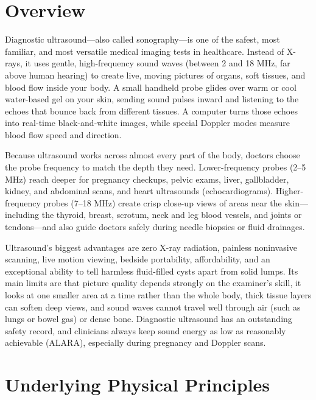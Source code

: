 \label{ch:infographic-ultrasound}

\section{Overview}

Diagnostic ultrasound---also called sonography---is one of the safest, most familiar, and most versatile medical imaging tests in healthcare. Instead of X-rays, it uses gentle, high-frequency sound waves (between 2 and 18 MHz, far above human hearing) to create live, moving pictures of organs, soft tissues, and blood flow inside your body. A small handheld probe glides over warm or cool water-based gel on your skin, sending sound pulses inward and listening to the echoes that bounce back from different tissues. A computer turns those echoes into real-time black-and-white images, while special Doppler modes measure blood flow speed and direction.

Because ultrasound works across almost every part of the body, doctors choose the probe frequency to match the depth they need. Lower-frequency probes (2--5 MHz) reach deeper for pregnancy checkups, pelvic exams, liver, gallbladder, kidney, and abdominal scans, and heart ultrasounds (echocardiograms). Higher-frequency probes (7--18 MHz) create crisp close-up views of areas near the skin---including the thyroid, breast, scrotum, neck and leg blood vessels, and joints or tendons---and also guide doctors safely during needle biopsies or fluid drainages.

Ultrasound's biggest advantages are zero X-ray radiation, painless noninvasive scanning, live motion viewing, bedside portability, affordability, and an exceptional ability to tell harmless fluid-filled cysts apart from solid lumps. Its main limits are that picture quality depends strongly on the examiner's skill, it looks at one smaller area at a time rather than the whole body, thick tissue layers can soften deep views, and sound waves cannot travel well through air (such as lungs or bowel gas) or dense bone. Diagnostic ultrasound has an outstanding safety record, and clinicians always keep sound energy as low as reasonably achievable (ALARA), especially during pregnancy and Doppler scans.

\section{Underlying Physical Principles}

